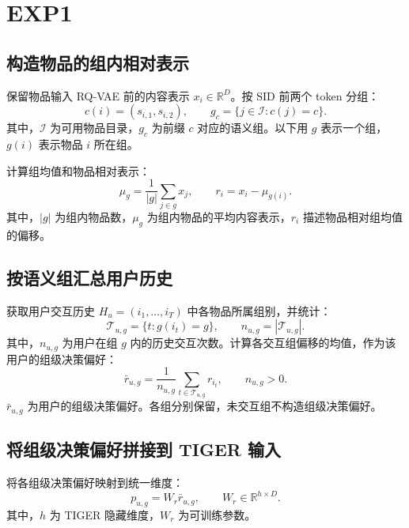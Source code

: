 \documentclass[UTF8,11pt,a4paper]{ctexart}
\begin{document}
\section{EXP1}

\subsection{构造物品的组内相对表示}

保留物品输入 RQ-VAE 前的内容表示 $x_i\in\mathbb{R}^{D}$。按 SID 前两个 token 分组：
\begin{equation}
 c(i)=(s_{i,1},s_{i,2}),\qquad
 g_c=\{j\in\mathcal I:c(j)=c\}.
\end{equation}
其中，$\mathcal I$ 为可用物品目录，$g_c$ 为前缀 $c$ 对应的语义组。以下用 $g$ 表示一个组，$g(i)$ 表示物品 $i$ 所在组。

计算组均值和物品相对表示：
\begin{equation}
 \mu_g=\frac{1}{|g|}\sum_{j\in g}x_j,\qquad
 r_i=x_i-\mu_{g(i)}.
\end{equation}
其中，$|g|$ 为组内物品数，$\mu_g$ 为组内物品的平均内容表示，$r_i$ 描述物品相对组均值的偏移。

\subsection{按语义组汇总用户历史}

获取用户交互历史 $H_u=(i_1,\ldots,i_T)$ 中各物品所属组别，并统计：
\begin{equation}
 \mathcal T_{u,g}=\{t:g(i_t)=g\},\qquad
 n_{u,g}=|\mathcal T_{u,g}|.
\end{equation}
其中，$n_{u,g}$ 为用户在组 $g$ 内的历史交互次数。计算各交互组偏移的均值，作为该用户的组级决策偏好：
\begin{equation}
 \bar r_{u,g}=\frac{1}{n_{u,g}}
 \sum_{t\in\mathcal T_{u,g}}r_{i_t},\qquad n_{u,g}>0.
\end{equation}
$\bar r_{u,g}$ 为用户的组级决策偏好。各组分别保留，未交互组不构造组级决策偏好。

\subsection{将组级决策偏好拼接到 TIGER 输入}

将各组级决策偏好映射到统一维度：
\begin{equation}
 p_{u,g}=W_r\bar r_{u,g},\qquad
 W_r\in\mathbb R^{h\times D}.
\end{equation}
其中，$h$ 为 TIGER 隐藏维度，$W_r$ 为可训练参数。
\end{document}
